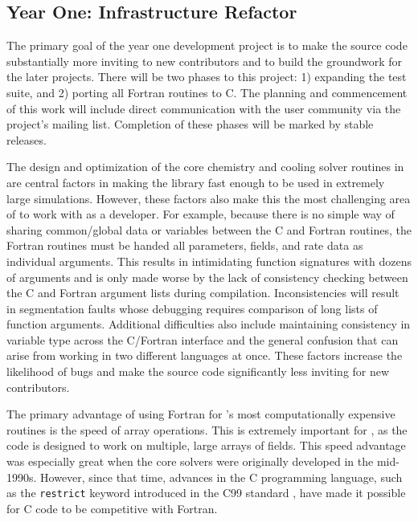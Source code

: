 \subsection{Year One: Infrastructure Refactor}

The primary goal of the year one development project is to make the
source code substantially more inviting to new contributors and to
build the groundwork for the later projects.  There will be two phases
to this project: 1) expanding the test suite, and 2) porting all
Fortran routines to C.  The planning and commencement of this work
will include direct communication with the \grackle{} user community
via the project's mailing list.  Completion of these phases will be
marked by stable releases.

The design and optimization of the core chemistry and cooling solver
routines in \grackle{} are central factors in making the library fast
enough to be used in extremely large simulations.  However, these
factors also make this the most challenging area of \grackle{} to
work with as a developer.  For example, because there is no simple way
of sharing common/global data or variables between the C and Fortran
routines, the Fortran routines must be handed all parameters, fields,
and rate data as individual arguments.  This results in intimidating
function signatures with dozens of arguments and is only made worse by
the lack of consistency checking between the C and Fortran argument
lists during compilation.  Inconsistencies will result in segmentation
faults whose debugging requires comparison of long lists of function
arguments.  Additional difficulties also include maintaining
consistency in variable type across the C/Fortran interface and the
general confusion that can arise from working in two different
languages at once.  These factors increase the likelihood of bugs and
make the source code significantly less inviting for new
contributors.

The primary advantage of using Fortran for \grackle{}'s most
computationally expensive routines is the speed of array operations.
This is extremely important for \grackle{}, as the code is designed to
work on multiple, large arrays of fields.  This speed advantage was
especially great when the core solvers were originally developed in
the mid-1990s.  However, since that time, advances in the C
programming language, such as the \texttt{restrict} keyword introduced
in the C99 standard \citep{c99}, have made it possible for C code to
be competitive with Fortran.

